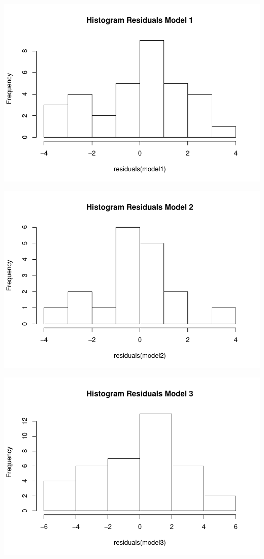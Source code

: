\documentclass[]{elsarticle} %
\makeatletter
\def\maxwidth{\ifdim\Gin@nat@width>\linewidth\linewidth
\else\Gin@nat@width\fi}
\let\Oldincludegraphics\includegraphics
\renewcommand{\includegraphics}[1]{\Oldincludegraphics[width=\maxwidth]{#1}}
\makeatother
\begin{document}
\includegraphics{stephanie-moura-rmarkdown-tf-ad-ufpe-2018_files/figure-latex/ggplot_resmodel_1-1.pdf}

\includegraphics{stephanie-moura-rmarkdown-tf-ad-ufpe-2018_files/figure-latex/ggplot_resmodel_2-1.pdf}

\includegraphics{stephanie-moura-rmarkdown-tf-ad-ufpe-2018_files/figure-latex/ggplot_resmodel_3-1.pdf}
\end{document}
